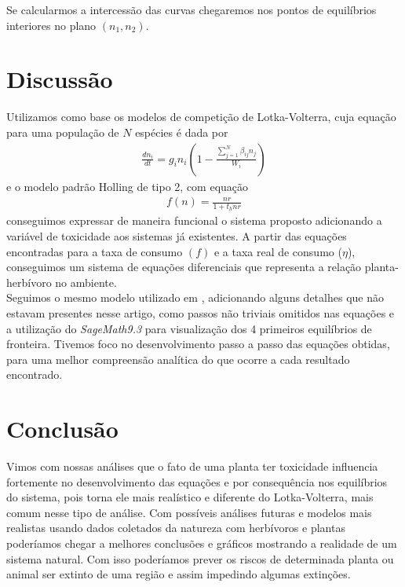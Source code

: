 \documentclass{article}
\begin{document}
Se calcularmos a intercessão das curvas chegaremos nos pontos de equilíbrios interiores no plano $(n_1, n_2)$.

\newpage

\section{Discussão}

Utilizamos como base os modelos de competição de Lotka-Volterra, cuja equação para uma população de $N$ espécies é dada por 
\begin{align*}
    \frac{dn_i}{dt} = g_in_i\left( 1 - \frac{\sum_{j=1}^N \beta_{ij}n_j}{W_i} \right)
\end{align*}
e o modelo padrão Holling de tipo 2, com equação
\begin{align*}
    f(n) = \frac{n r}{1 + t_h n r}
\end{align*}
conseguimos expressar de maneira funcional o sistema proposto adicionando a variável de toxicidade aos sistemas já existentes. A partir das equações encontradas para a taxa de consumo $(f)$ e a taxa real de consumo ($\eta$), conseguimos um sistema de equações diferenciais que representa a relação planta-herbívoro no ambiente. \\

Seguimos o mesmo modelo utilizado em \cite{LI}, adicionando alguns detalhes que não estavam presentes nesse artigo, como passos não triviais omitidos nas equações e a utilização do \textit{SageMath9.3} para visualização dos 4 primeiros equilíbrios de fronteira. Tivemos foco no desenvolvimento passo a passo das equações obtidas, para uma melhor compreensão analítica do que ocorre a cada resultado encontrado.

\section{Conclusão}

Vimos com nossas análises que o fato de uma planta ter toxicidade influencia fortemente no desenvolvimento das equações e por consequência nos equilíbrios do sistema, pois torna ele mais realístico e diferente do Lotka-Volterra, mais comum nesse tipo de análise. Com possíveis análises futuras e modelos mais realistas usando dados coletados da natureza com herbívoros e plantas poderíamos chegar a melhores conclusões e gráficos mostrando a realidade de um sistema natural. Com isso poderíamos prever os riscos de determinada planta ou animal ser extinto de uma região e assim impedindo algumas extinções. 

\newpage



\end{document}
